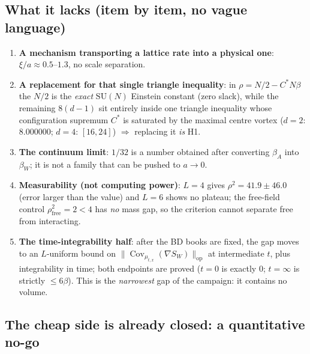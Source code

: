 \subsection{What it lacks (item by item, no vague language)}

\begin{enumerate}[label=(\arabic*)]
\item \textbf{A mechanism transporting a lattice rate into a physical one}: $\xi/a\approx0.5$--$1.3$,
      no scale separation. \LM
\item \textbf{A replacement for that single triangle inequality}: in $\rho=N/2-C^{*}N\beta$ the $N/2$
      is the \emph{exact} $\mathrm{SU}(N)$ Einstein constant (zero slack), while the remaining
      $8(d-1)$ sit entirely inside one triangle inequality whose configuration supremum $C^{*}$ is
      saturated by the maximal centre vortex ($d=2$: $8.000000$; $d=4$: $[16,24]$) $\Rightarrow$
      replacing it \emph{is} H1. \LT
\item \textbf{The continuum limit}: $1/32$ is a number obtained after converting $\beta_A$ into
      $\beta_W$; it is not a family that can be pushed to $a\to0$. \LM
\item \textbf{Measurability (not computing power)}: $L=4$ gives $\rho^{2}=41.9\pm46.0$ (error larger
      than the value) and $L=6$ shows no plateau; the free-field control
      $\rho^{2}_{\mathrm{free}}=2<4$ has \emph{no} mass gap, so the criterion cannot separate free from
      interacting. \LE
\item \textbf{The time-integrability half}: after the BD books are fixed, the gap moves to an
      $L$-uniform bound on $\|\operatorname{Cov}_{\mu_{t,x}}(\nabla S_W)\|_{\mathrm{op}}$ at
      intermediate $t$, plus integrability in time; both endpoints are proved ($t=0$ is exactly $0$;
      $t=\infty$ is strictly $\le6\beta$). This is the \emph{narrowest} gap of the campaign: it
      contains no volume. \LM
\end{enumerate}

\subsection{The cheap side is already closed: a quantitative no-go}

